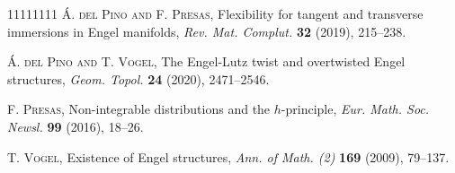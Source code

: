 \documentclass{amsart} %
\theoremstyle{thm}
\theoremstyle{definition}
\begin{document}
\begin{thebibliography} {11111111}
 \textsc{\'{A}. del Pino and F. Presas}, Flexibility for tangent and transverse immersions in Engel manifolds, \textit{Rev. Mat. Complut.} \textbf{32} (2019), 215--238.

 \textsc{\'{A}. del Pino and T. Vogel}, The Engel-Lutz twist and overtwisted Engel structures, \textit{Geom. Topol.} \textbf{24} (2020), 2471--2546.

 \textsc{F. Presas}, Non-integrable distributions and the $h$-principle, \textit{Eur. Math. Soc. Newsl.} \textbf{99} (2016), 18--26.

 \textsc{T. Vogel}, Existence of Engel structures, \textit{Ann. of Math. (2)} \textbf{169} (2009), 79--137.


\end{thebibliography}


\end{document}
